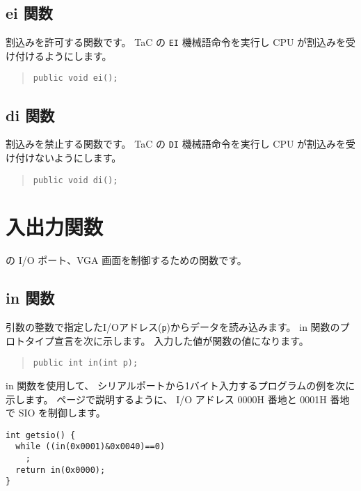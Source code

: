 \subsection{ei 関数}

割込みを許可する関数です。
TaC の \verb/EI/ 機械語命令を実行し
CPU が割込みを受け付けるようにします。

\begin{quote}
\begin{verbatim}
public void ei();
\end{verbatim}
\end{quote}

\subsection{di 関数}

割込みを禁止する関数です。
TaC の \verb/DI/ 機械語命令を実行し
CPU が割込みを受け付けないようにします。

\begin{quote}
\begin{verbatim}
public void di();
\end{verbatim}
\end{quote}

\section{入出力関数}

\tac の I/O ポート、VGA 画面を制御するための関数です。

\subsection{in 関数}

引数の整数で指定したI/Oアドレス(\verb/p/)からデータを読み込みます。
in 関数のプロトタイプ宣言を次に示します。
入力した値が関数の値になります。

\begin{quote}
\begin{verbatim}
public int in(int p);
\end{verbatim}
\end{quote}

in 関数を使用して、
シリアルポートから1バイト入力するプログラムの例を次に示します。
\pageref{app:sio}ページで説明するように、
I/O アドレス 0000H 番地と 0001H 番地で SIO を制御します。

\begin{mylist}
\begin{verbatim}
int getsio() {
  while ((in(0x0001)&0x0040)==0)
    ;
  return in(0x0000);
}
\end{verbatim}
\end{mylist}

